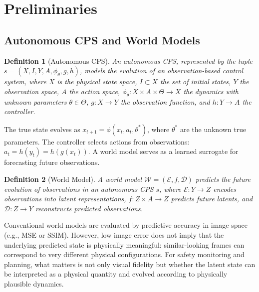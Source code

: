 \documentclass[preprint,12pt]{elsarticle}
\newtheorem{definition}{Definition}
\begin{document}
\section{Preliminaries}\label{sec:preliminaries}

\subsection{Autonomous CPS and World Models}

\begin{definition}[Autonomous CPS]
An \emph{autonomous CPS}, represented by the tuple $s = (X, I, Y, A, \phi_{\theta}, g, h)$, models the
evolution of an observation-based control system, where $X$ is the physical
state space, $I \subset X$ the set of initial states, $Y$ the observation space,
$A$ the action space, $\phi_{\theta}: X \times A \times \Theta \rightarrow X$ the
dynamics with unknown parameters $\theta \in \Theta$, $g: X \rightarrow Y$ the
observation function, and $h: Y \rightarrow A$ the controller.
\end{definition}

The true state evolves as $x_{t+1} = \phi(x_t, a_t, \theta^*)$, where $\theta^*$
are the unknown true parameters.
The controller selects actions from observations: $a_t = h(y_t) = h(g(x_t))$.
A world model serves as a learned surrogate for forecasting future observations.

\begin{definition}[World Model]
A \emph{world model} $\mathcal{W} = (\mathcal{E}, f, \mathcal{D})$ predicts the
future evolution of observations in an autonomous CPS $s$, where
$\mathcal{E}: Y \rightarrow Z$ encodes observations into latent representations,
$f: Z \times A \rightarrow Z$ predicts future latents, and
$\mathcal{D}: Z \rightarrow Y$ reconstructs predicted observations.
\end{definition}

Conventional world models are evaluated by predictive accuracy in image space
(e.g., MSE or SSIM).
However, low image error does not imply that the underlying predicted state is
physically meaningful: similar-looking frames can correspond to very different
physical configurations.
For safety monitoring and planning, what matters is not only visual fidelity but
whether the latent state can be interpreted as a physical quantity and evolved
according to physically plausible dynamics.
\end{document}
